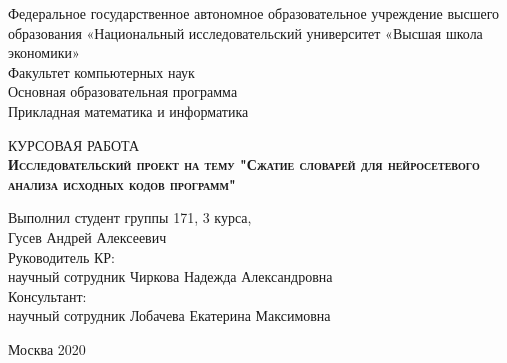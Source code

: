 \begin{titlepage}
\newpage

{
\begin{center}
Федеральное государственное автономное образовательное учреждение высшего образования «Национальный исследовательский университет «Высшая школа экономики»
\\
\bigskip
Факультет компьютерных наук \\
Основная образовательная программа \\
Прикладная математика и информатика \\
\end{center}
}

\vspace{8em}

\begin{center}
{\Large КУРСОВАЯ РАБОТА}\\
\textsc{\textbf{
Исследовательский проект на тему
\linebreak
"Сжатие словарей для нейросетевого анализа исходных кодов программ"}}
\end{center}

\vspace{2em}

{
\hfill\parbox{16cm}{
\hspace*{5cm}\hspace*{-5cm}Выполнил студент группы 171, 3 курса,\\
 Гусев Андрей Алексеевич\\
 
\hspace*{5cm}\hspace*{-5cm}Руководитель КР:\\
научный сотрудник Чиркова Надежда Александровна\\


\hspace*{5cm}\hspace*{-5cm}Консультант:\\
научный сотрудник Лобачева Екатерина Максимовна\\
}
}

\vspace{\fill}

\begin{center}
Москва 2020
\end{center}

\end{titlepage}